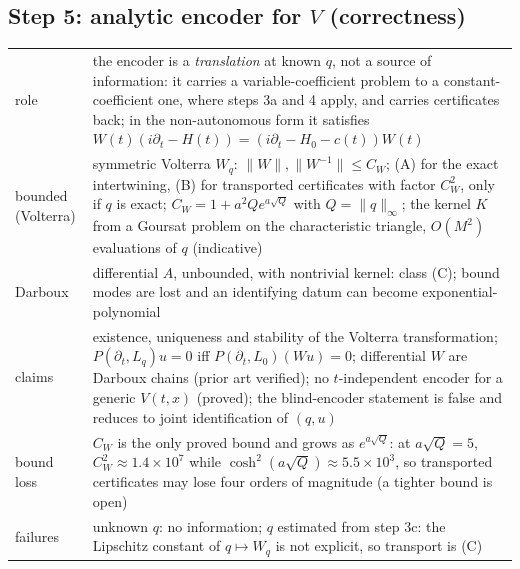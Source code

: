 \documentclass[11pt]{article}
\theoremstyle{plain}
\theoremstyle{definition}
\theoremstyle{remark}
\begin{document}
\subsection*{Step 5: analytic encoder for $V$ (correctness)}
\begin{tabular}{@{}p{2.2cm}p{9.6cm}@{}}
\toprule
role & the encoder is a \emph{translation} at known $q$, not a source of information: it carries a variable-coefficient problem to a constant-coefficient one, where steps 3a and 4 apply, and carries certificates back; in the non-autonomous form it satisfies $W(t)(i\partial_t-H(t))=(i\partial_t-H_0-c(t))W(t)$\\
bounded (Volterra) & symmetric Volterra $W_q$: $\lVert W\rVert,\lVert W^{-1}\rVert\le C_W$; (A) for the exact intertwining, (B) for transported certificates with factor $C_W^2$, only if $q$ is exact; $C_W=1+a^2Qe^{a\sqrt Q}$ with $Q=\lVert q\rVert_\infty$; the kernel $K$ from a Goursat problem on the characteristic triangle, $O(M^2)$ evaluations of $q$ (indicative)\\
Darboux & differential $A$, unbounded, with nontrivial kernel: class (C); bound modes are lost and an identifying datum can become exponential-polynomial\\
claims & existence, uniqueness and stability of the Volterra transformation; $P(\partial_t,L_q)u=0$ iff $P(\partial_t,L_0)(Wu)=0$; differential $W$ are Darboux chains (prior art verified); no $t$-independent encoder for a generic $V(t,x)$ (proved); the blind-encoder statement is false and reduces to joint identification of $(q,u)$\\
bound loss & $C_W$ is the only proved bound and grows as $e^{a\sqrt Q}$: at $a\sqrt Q=5$, $C_W^2\approx1.4\times10^7$ while $\cosh^2(a\sqrt Q)\approx5.5\times10^3$, so transported certificates may lose four orders of magnitude (a tighter bound is open)\\
failures & unknown $q$: no information; $q$ estimated from step 3c: the Lipschitz constant of $q\mapsto W_q$ is not explicit, so transport is (C)\\
\bottomrule
\end{tabular}
\end{document}
